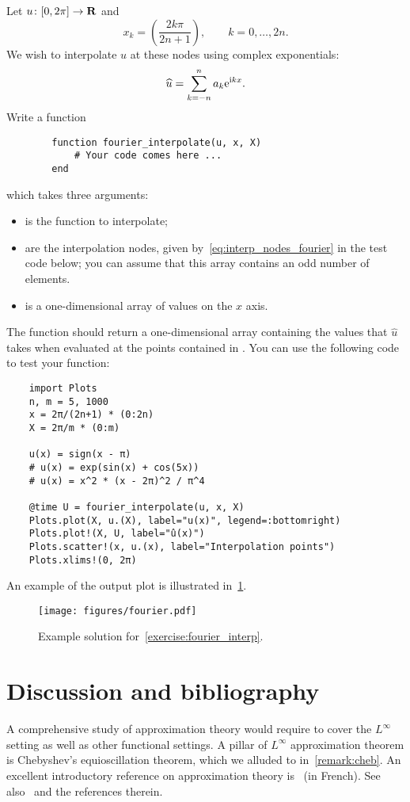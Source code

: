 \begin{compexercise}
    \label{exercise:fourier_interp}
    Let $u\colon [0, 2\pi] \to \mathbf R$ and
    \begin{equation}
        \label{eq:interp_nodes_fourier}
        x_k = \left( \frac{2k\pi}{2n+1} \right), \qquad k = 0, \dotsc, 2n.
    \end{equation}
    We wish to interpolate $u$ at these nodes using complex exponentials:
    \[
        \widehat u = \sum_{k=-n}^{n} a_k \mathrm e^{\mathrm i k x}.
    \]
    Write a function
    \begin{verbatim}
        function fourier_interpolate(u, x, X)
            # Your code comes here ...
        end
    \end{verbatim}
    which takes three arguments:
    \begin{itemize}
        \item {} is the function to interpolate;

        \item {} are the interpolation nodes, given by~\eqref{eq:interp_nodes_fourier} in the test code below;
            you can assume that this array contains an odd number of elements.

        \item {} is a one-dimensional array of values on the $x$ axis.
    \end{itemize}
    The function should return a one-dimensional array containing the values that $\widehat u$ takes when evaluated at the points contained in .
    You can use the following code to test your function:
    \begin{verbatim}
    import Plots
    n, m = 5, 1000
    x = 2π/(2n+1) * (0:2n)
    X = 2π/m * (0:m)

    u(x) = sign(x - π)
    # u(x) = exp(sin(x) + cos(5x))
    # u(x) = x^2 * (x - 2π)^2 / π^4

    @time U = fourier_interpolate(u, x, X)
    Plots.plot(X, u.(X), label="u(x)", legend=:bottomright)
    Plots.plot!(X, U, label="û(x)")
    Plots.scatter!(x, u.(x), label="Interpolation points")
    Plots.xlims!(0, 2π)
    \end{verbatim}
    An example of the output plot is illustrated in~\cref{fig:fourier}.
\end{compexercise}
\begin{figure}[ht]
    \centering
    \texttt{[image: figures/fourier.pdf]}
    \caption{Example solution for~\cref{exercise:fourier_interp}.}%
    \label{fig:fourier}
\end{figure}

\section{Discussion and bibliography}
A comprehensive study of approximation theory would require to cover the $L^{\infty}$ setting
as well as other functional settings.
A pillar of $L^{\infty}$ approximation theorem is Chebyshev's equioscillation theorem, which we alluded to in~\cref{remark:cheb}.
An excellent introductory reference on approximation theory is~\cite{magnus} (in French).
See also~\cite[Chapter 10]{MR2265914} and the references therein.
